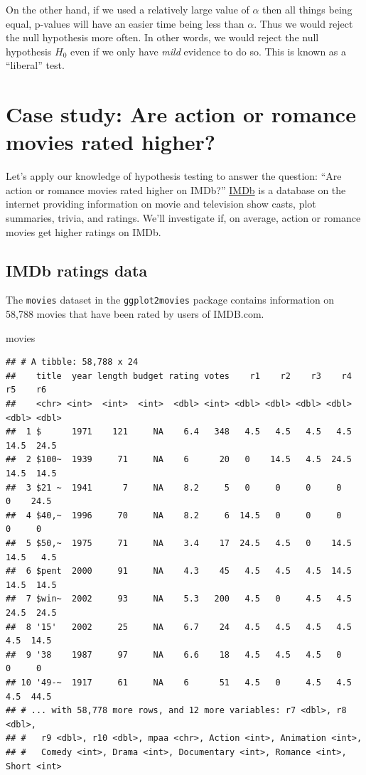 \documentclass[
]{book}
\newenvironment{Shaded}{\begin{snugshade}}{\end{snugshade}}
\newcommand{\NormalTok}[1]{#1}
\begin{document}
On the other hand, if we used a relatively large value of \(\alpha\) then all things being equal, p-values will have an easier time being less than \(\alpha\). Thus we would reject the null hypothesis more often. In other words, we would reject the null hypothesis \(H_0\) even if we only have \emph{mild} evidence to do so. This is known as a ``liberal'' test.

\hypertarget{ht-case-study}{%
\section{Case study: Are action or romance movies rated higher?}\label{ht-case-study}}

Let's apply our knowledge of hypothesis testing to answer the question: ``Are action or romance movies rated higher on IMDb?'' \href{https://www.imdb.com/}{IMDb} is a database on the internet providing information on movie and television show casts, plot summaries, trivia, and ratings. We'll investigate if, on average, action or romance movies get higher ratings on IMDb.

\hypertarget{imdb-data}{%
\subsection{IMDb ratings data}\label{imdb-data}}

The \texttt{movies} dataset in the \texttt{ggplot2movies} package contains information on 58,788 movies that have been rated by users of IMDB.com.

\begin{Shaded}
\begin{Highlighting}[]
\NormalTok{movies}
\end{Highlighting}
\end{Shaded}

\begin{verbatim}
## # A tibble: 58,788 x 24
##    title  year length budget rating votes    r1    r2    r3    r4    r5    r6
##    <chr> <int>  <int>  <int>  <dbl> <int> <dbl> <dbl> <dbl> <dbl> <dbl> <dbl>
##  1 $      1971    121     NA    6.4   348   4.5   4.5   4.5   4.5  14.5  24.5
##  2 $100~  1939     71     NA    6      20   0    14.5   4.5  24.5  14.5  14.5
##  3 $21 ~  1941      7     NA    8.2     5   0     0     0     0     0    24.5
##  4 $40,~  1996     70     NA    8.2     6  14.5   0     0     0     0     0  
##  5 $50,~  1975     71     NA    3.4    17  24.5   4.5   0    14.5  14.5   4.5
##  6 $pent  2000     91     NA    4.3    45   4.5   4.5   4.5  14.5  14.5  14.5
##  7 $win~  2002     93     NA    5.3   200   4.5   0     4.5   4.5  24.5  24.5
##  8 '15'   2002     25     NA    6.7    24   4.5   4.5   4.5   4.5   4.5  14.5
##  9 '38    1987     97     NA    6.6    18   4.5   4.5   4.5   0     0     0  
## 10 '49-~  1917     61     NA    6      51   4.5   0     4.5   4.5   4.5  44.5
## # ... with 58,778 more rows, and 12 more variables: r7 <dbl>, r8 <dbl>,
## #   r9 <dbl>, r10 <dbl>, mpaa <chr>, Action <int>, Animation <int>,
## #   Comedy <int>, Drama <int>, Documentary <int>, Romance <int>, Short <int>
\end{verbatim}
\end{document}
